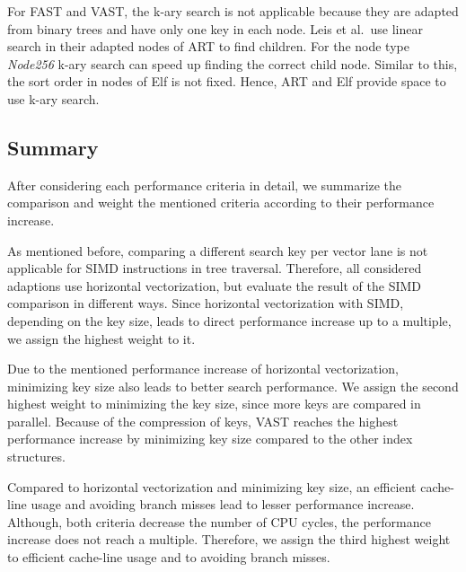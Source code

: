 \documentclass[runningheads,a4paper]{llncs}
\begin{document}
For FAST and VAST, the k-ary search is not applicable because they are adapted from binary trees and have only one key in each node. Leis et al.\ use linear search in their adapted nodes of ART to find children. For the node type \emph{Node256} k-ary search can speed up finding the correct child node. 
Similar to this, the sort order in nodes of Elf is not fixed. Hence, ART and Elf provide space to use k-ary search.

\subsection{Summary}

After considering each performance criteria in detail, we summarize the comparison and weight the mentioned criteria according to their performance increase. 

As mentioned before, comparing a different search key per vector lane is not applicable for SIMD instructions in tree traversal. Therefore, all considered adaptions use horizontal vectorization, but evaluate the result of the SIMD comparison in different ways. Since horizontal vectorization with SIMD, depending on the key size, leads to direct performance increase up to a multiple, we assign the highest weight to it. 

Due to the mentioned performance increase of horizontal vectorization, minimizing key size also leads to better search performance. We assign the second highest weight to minimizing the key size, since more keys are compared in parallel. Because of the compression of keys, VAST reaches the highest performance increase by minimizing key size compared to the other index structures. 

Compared to horizontal vectorization and minimizing key size, an efficient cache-line usage and avoiding branch misses lead to lesser performance increase. Although, both criteria decrease the number of CPU cycles, the performance increase does not reach a multiple. Therefore, we assign the third highest weight to efficient cache-line usage and to avoiding branch misses.
\end{document}

